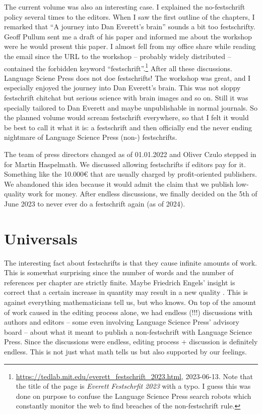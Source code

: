 \documentclass[output=paper,colorlinks,citecolor=brown]{langscibook}
\begin{document}
The current volume was also an interesting case. I explained the no-festschrift policy several
times to the editors. When I saw the first outline of the chapters, I remarked that ``A journey into Dan Everett's
brain'' sounds a bit too festschrifty. Geoff Pullum sent me a draft of his paper and informed me
about the workshop were he would present this paper. I almost fell from my office share while
reading the email since the URL to the workshop -- probably widely distributed -- contained the forbidden keyword
``festschrift''.\footnote{
\url{https://tedlab.mit.edu/everett_festschrift_2023.html}, 2023-06-13. Note that the title of the
page is \emph{Everett Festschrfit 2023} with a typo. I guess this was done on purpose to confuse the
Language Science Press search robots which constantly monitor the web to find breaches of the
non-festschrift rule.
} After all these discussions. Language Sciene Press does not doe festschrifts! The
workshop was great, and I especially enjoyed the journey into Dan Everett's brain. This was not
sloppy festschrift chitchat but serious science with brain images and so on. Still it was specially
tailored to Dan Everett and maybe unpublishable in normal journals. So the planned volume would
scream festschrift everywhere, so that I felt it would be best to call it what it is: a festschrift
and then officially end the never ending nightmare of Language Science Press (non-) festschrifts. 

The team of press directors changed as of 01.01.2022 and Oliver Czulo stepped in for
Martin Haspelmath. We discussed allowing festschrifts if editors pay for it. Something like the
10.000€ that are usually charged by profit-oriented publishers.
 We abandoned this idea because it
would admit the claim that we publish low-quality work for money. After endless discussions, we
finally decided on the 5th of June 2023 to never ever do a festschrift again (as of 2024). 






\section{Universals}

The interesting fact about festschrifts is that they cause infinite amounts of work. This is somewhat
surprising since the number of words and the number of references per chapter are strictly
finite. Maybe Friedrich Engels' insight is correct that a certain increase in quantity may result in a new
quality \citep[]{Engels1873a-u}. This is against everything mathematicians tell us, but who knows.
On top of the amount of work caused in the editing process alone, we had endless (!!!) discussions
with authors and editors -- some even involving Language Science Press' advisory board -- about what it meant to publish a non-festschrift with Language Science
Press. Since the discussions were endless, editing process + discussion is definitely endless. This
is not just what math tells us but also supported by our feelings.
\end{document}
